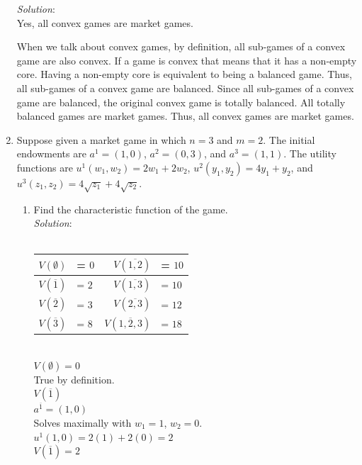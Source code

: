 \documentclass{article}
\begin{document}
\begin{enumerate}
\textit{Solution}: \\
Yes, all convex games are market games.

When we talk about convex games, by definition, all sub-games of a convex game are also convex. If a game is convex that means that it has a non-empty core. Having a non-empty core is equivalent to being a balanced game. Thus, all sub-games of a convex game are balanced. Since all sub-games of a convex game are balanced, the original convex game is totally balanced. All totally balanced games are market games. Thus, all convex games are market games.

%
\hfill\newline
\item Suppose given a market game in which $n = 3$ and $m = 2$. The initial endowments are $a^{1} = (1, 0)$, $a^{2} = (0, 3)$, and $a^{3} = (1, 1)$. The utility functions are $u^{1}(w_{1}, w_{2}) = 2w_{1} + 2w_{2}$, $u^{2}(y_{1}, y_{2}) = 4y_{1} + y_{2}$, and $u^{3}(z_{1}, z_{2}) = 4\sqrt{z_{1}} + 4\sqrt{z_{2}}$.\\

    \begin{enumerate}
    \item Find the characteristic function of the game. \\

    \textit{Solution}: \\\\
    \begin{tabular}{| r l | r l |}
    \hline
    $V(\emptyset)    $ &= $0$  &  $V(\overline{1, 2})    $ &= $10$ \\
    \hline
    $V(\overline{1}) $ &= $2$  &  $V(\overline{1, 3})    $ &= $10$ \\
    \hline
    $V(\overline{2}) $ &= $3$  &  $V(\overline{2, 3})    $ &= $12$ \\
    \hline
    $V(\overline{3}) $ &= $8$  &  $V(\overline{1, 2, 3}) $ &= $18$ \\
    \hline
    \end{tabular} \hfill \\

    $V(\emptyset) = 0$ \\
    True by definition. \\

    $V(\overline{1})$ \\
    $a^{\overline{1}} = (1, 0)$ \\
    Solves maximally with $w_{1} = 1$, $w_{2} = 0$. \\
    $u^{1}(1, 0) = 2(1) + 2(0) = 2$ \\
    $V(\overline{1}) = 2$ \\


\end{enumerate}
\end{enumerate}
\end{document}
